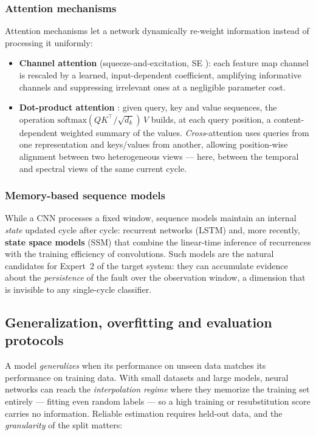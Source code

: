 \subsubsection{Attention mechanisms}

Attention mechanisms let a network dynamically re-weight information instead of processing it uniformly:

\begin{itemize}[itemsep=2pt]
    \item \textbf{Channel attention} (squeeze-and-excitation, SE \cite{hu2018squeeze}): each feature map channel is rescaled by a learned, input-dependent coefficient, amplifying informative channels and suppressing irrelevant ones at a negligible parameter cost.
    \item \textbf{Dot-product attention} \cite{vaswani2017attention}: given query, key and value sequences, the operation $\mathrm{softmax}(QK^{\top}/\sqrt{d_k})\,V$ builds, at each query position, a content-dependent weighted summary of the values. \emph{Cross}-attention uses queries from one representation and keys/values from another, allowing position-wise alignment between two heterogeneous views --- here, between the temporal and spectral views of the same current cycle.
\end{itemize}

\subsubsection{Memory-based sequence models}

While a CNN processes a fixed window, sequence models maintain an internal \emph{state} updated cycle after cycle: recurrent networks (LSTM) and, more recently, \textbf{state space models} (SSM) that combine the linear-time inference of recurrences with the training efficiency of convolutions. Such models are the natural candidates for Expert~2 of the target system: they can accumulate evidence about the \emph{persistence} of the fault over the observation window, a dimension that is invisible to any single-cycle classifier.

\subsection{Generalization, overfitting and evaluation protocols}

A model \emph{generalizes} when its performance on unseen data matches its performance on training data. With small datasets and large models, neural networks can reach the \emph{interpolation regime} where they memorize the training set entirely --- fitting even random labels \cite{zhang2017rethinking} --- so a high training or resubstitution score carries no information. Reliable estimation requires held-out data, and the \emph{granularity} of the split matters:

